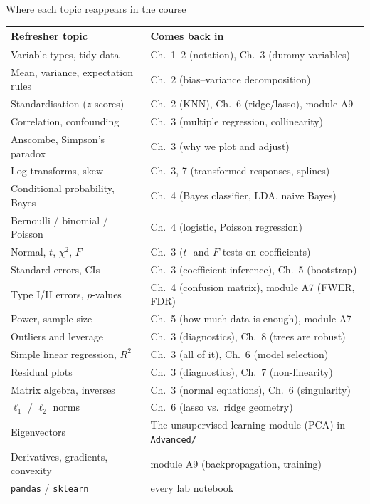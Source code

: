 \documentclass[aspectratio=169,11pt]{beamer}
\begin{document}
\begin{frame}{Where each topic reappears in the course}
  \tiny
  \begin{center}
  \begin{tabular}{@{}ll@{}}
    \toprule
    \textbf{Refresher topic} & \textbf{Comes back in} \\
    \midrule
    Variable types, tidy data & Ch.\ 1--2 (notation), Ch.\ 3 (dummy variables) \\
    Mean, variance, expectation rules & Ch.\ 2 (bias--variance decomposition) \\
    Standardisation ($z$-scores) & Ch.\ 2 (KNN), Ch.\ 6 (ridge/lasso), module A9 \\
    Correlation, confounding & Ch.\ 3 (multiple regression, collinearity) \\
    Anscombe, Simpson's paradox & Ch.\ 3 (why we plot and adjust) \\
    Log transforms, skew & Ch.\ 3, 7 (transformed responses, splines) \\
    Conditional probability, Bayes & Ch.\ 4 (Bayes classifier, LDA, naive Bayes) \\
    Bernoulli / binomial / Poisson & Ch.\ 4 (logistic, Poisson regression) \\
    Normal, $t$, $\chi^2$, $F$ & Ch.\ 3 ($t$- and $F$-tests on coefficients) \\
    Standard errors, CIs & Ch.\ 3 (coefficient inference), Ch.\ 5 (bootstrap) \\
    Type I/II errors, $p$-values & Ch.\ 4 (confusion matrix), module A7 (FWER, FDR) \\
    Power, sample size & Ch.\ 5 (how much data is enough), module A7 \\
    Outliers and leverage & Ch.\ 3 (diagnostics), Ch.\ 8 (trees are robust) \\
    Simple linear regression, $R^2$ & Ch.\ 3 (all of it), Ch.\ 6 (model selection) \\
    Residual plots & Ch.\ 3 (diagnostics), Ch.\ 7 (non-linearity) \\
    Matrix algebra, inverses & Ch.\ 3 (normal equations), Ch.\ 6 (singularity) \\
    $\ell_1$ / $\ell_2$ norms & Ch.\ 6 (lasso vs.\ ridge geometry) \\
    Eigenvectors & The unsupervised-learning module (PCA) in \texttt{Advanced/} \\
    Derivatives, gradients, convexity & module A9 (backpropagation, training) \\
    \texttt{pandas} / \texttt{sklearn} & every lab notebook \\
    \bottomrule
  \end{tabular}
  \end{center}
\end{frame}
\end{document}
